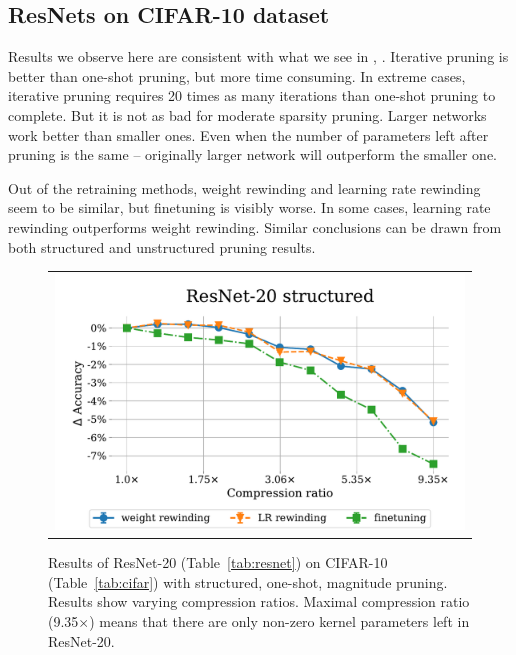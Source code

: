 \subsection{ResNets on CIFAR-10 dataset}

\nopagebreak

Results we observe here are consistent with what we see in \cite{Renda}, \cite{Frankle}.
Iterative pruning is better than one-shot pruning, but more time consuming.
In extreme cases, iterative pruning requires 20 times as many iterations than one-shot pruning to complete.
But it is not as bad for moderate sparsity pruning.
Larger networks work better than smaller ones.
Even when the number of parameters left after pruning is the same -- originally larger network will outperform the smaller one.

Out of the retraining methods, weight rewinding and learning rate rewinding seem to be similar, but finetuning is visibly worse.
In some cases, learning rate rewinding outperforms weight rewinding.
Similar conclusions can be drawn from both structured and unstructured pruning results.

\begin{figure}[H]
  \setlength{\tabcolsep}{0pt}
  \centering
      \begin{tabular}{c}
        \includegraphics[width=0.7\linewidth]{pics/Resnet20-structured.pdf}
      \end{tabular}
  \caption{Results of ResNet-20 (Table~\ref{tab:resnet}) on CIFAR-10 (Table~\ref{tab:cifar}) with structured, one-shot, magnitude pruning. Results show varying compression ratios. Maximal compression ratio (9.35$\times$) means that there are only  non-zero kernel parameters left in ResNet-20.}
  \label{fig:resnet20-2}
  \end{figure}

